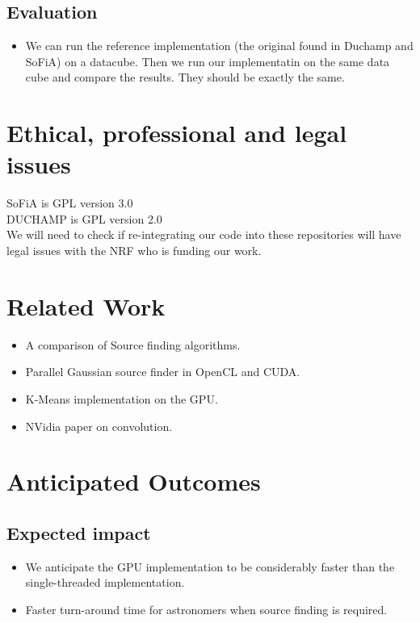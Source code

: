 \documentclass[prodmode,acmtecs]{acmsmall} \usepackage[ruled]{algorithm2e}
\begin{document}
\subsection{Evaluation}
\begin{itemize}
\item We can run the reference implementation (the original found in Duchamp and SoFiA)
on a datacube. Then we run our implementatin on the same data cube and compare the results.
They should be exactly the same.
\end{itemize}

\section{Ethical, professional and legal issues}

SoFiA is GPL version 3.0\\
DUCHAMP is GPL version 2.0\\
We will need to check if re-integrating our code into these repositories will have legal issues with the NRF who is funding our work.

\section{Related Work}
\begin{itemize}
\item A comparison of Source finding algorithms. \cite{popping2012comparison}
\item Parallel Gaussian source finder in OpenCL and CUDA. \cite{westerlund2015performance}
\item K-Means implementation on the GPU. \cite{wu2009clustering}
\item NVidia paper on convolution. \cite{Image Convolution with CUDA by Victor Podlozhnyuk}
\end{itemize}

\section{Anticipated Outcomes}

\subsection{Expected impact}
\begin{itemize}
\item We anticipate the GPU implementation to be considerably faster than the single-threaded implementation. 
\item Faster turn-around time for astronomers when source finding is required.
\end{itemize}
\end{document}
